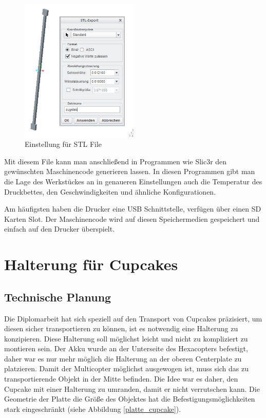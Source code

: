 			\begin{figure}[tbh]
			\begin{centering}
			\includegraphics[width = 0.5\textwidth]{Bilder/stl_file_optionen}
			\par\end{centering}
	 		\caption{Einstellung für STL File}
			\label{stl_file_optionen}
			\end{figure}

		Mit diesem File kann man anschließend in Programmen wie Slic3r den gewünschten Maschinencode generieren lassen.
		In diesen Programmen gibt man die Lage des Werkstückes an \bzw in genaueren Einstellungen auch die Temperatur des Druckbettes, den Geschwindigkeiten und ähnliche Konfigurationen.

		Am häufigsten haben die Drucker eine USB Schnittstelle, \bzw verfügen über einen SD Karten Slot.
		Der Maschinencode wird auf diesen Speichermedien gespeichert und einfach auf den Drucker überspielt.


\section{Halterung für Cupcakes}

		\subsection{Technische Planung}

		Die Diplomarbeit hat sich speziell auf den Transport von Cupcakes präzisiert, um diesen sicher transportieren zu können, ist es notwendig eine Halterung zu konzipieren.
		Diese Halterung soll möglichst leicht und nicht zu kompliziert zu montieren sein.
		Der Akku wurde an der Unterseite des Hexacopters befestigt, daher war es nur mehr möglich die Halterung an der oberen Centerplate zu platzieren.
		Damit der Multicopter möglichst ausgewogen ist, muss sich das zu transportierende Objekt in der Mitte befinden. Die Idee war es daher, den Cupcake mit einer Halterung zu umranden, damit er nicht verrutschen kann.
		Die Geometrie der Platte \bzw die Größe des Objektes hat die Befestigungsmöglichkeiten stark eingeschränkt (siehe Abbildung \ref{platte_cupcake}).

